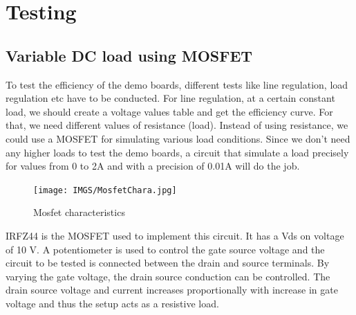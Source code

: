 

\chapter{Testing}

\section{Variable DC load using MOSFET}
To test the efficiency of the demo boards, different tests like line regulation, load regulation etc have to be conducted. For line regulation, at a certain constant load, we should create a voltage values table and get the efficiency curve. For that, we need different values of resistance (load). Instead of using resistance, we could use a MOSFET for simulating various load conditions. Since we don’t need any higher loads to test the demo boards, a circuit that simulate a load precisely for values from 0 to 2A and with a precision of 0.01A will do the job.

\begin{figure}[h]
	\centering
	\texttt{[image: IMGS/MosfetChara.jpg]}
	\caption{Mosfet characteristics}
	\label{fig:arch}
\end{figure} 

IRFZ44 is the MOSFET used to implement this circuit. It has a Vds on voltage of 10 V. A potentiometer is used to control the gate source voltage and the circuit to be tested is connected between the drain and source terminals. By varying the gate voltage, the drain source conduction can be controlled. The drain source voltage and current increases proportionally with increase in gate voltage and thus the setup acts as a resistive load. 

